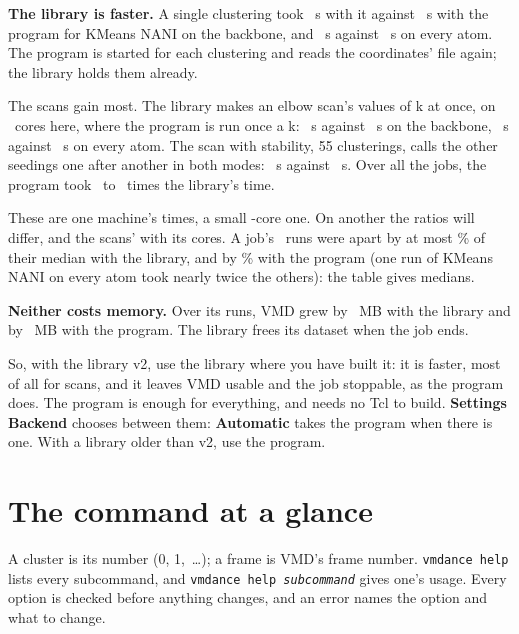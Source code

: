 \documentclass[11pt,letterpaper]{article}
\newcommand{\ui}[1]{\textsf{\textbf{#1}}}
\newcommand{\then}{\,\raisebox{0.15ex}{\scalebox{0.6}{$\blacktriangleright$}}\,}
\newcommand{\cmd}[1]{\texttt{#1}}
\newcommand{\meta}[1]{\textrm{\emph{#1}}}
\begin{document}
\textbf{The library is faster.} A single clustering took \bnKmeansLib\ s
with it against \bnKmeansCli\ s with the program for KMeans NANI on the
backbone, and \bnKmeansAllLib\ s against \bnKmeansAllCli\ s on every atom.
The program is started for each clustering and reads the coordinates' file
again; the library holds them already.

The scans gain most. The library makes an elbow scan's values of k at once,
on \bnCores\ cores here, where the program is run once a k: \bnElbowLib\ s
against \bnElbowCli\ s on the backbone, \bnElbowAllLib\ s against
\bnElbowAllCli\ s on every atom. The scan with stability, 55 clusterings,
calls the other seedings one after another in both modes: \bnStabilityLib\ s
against \bnStabilityCli\ s. Over all the jobs, the program took \bnGainMin\
to \bnGainMax\ times the library's time.

These are one machine's times, a small \bnCores-core one. On another the
ratios will differ, and the scans' with its cores. A job's \bnReps\ runs
were apart by at most \bnSpreadLib\% of their median with the library, and
by \bnSpreadCli\% with the program (one run of KMeans NANI on every atom
took nearly twice the others): the table gives medians.

\textbf{Neither costs memory.} Over its runs, VMD grew by \bnMemLib\ MB with
the library and by \bnMemCli\ MB with the program. The library frees its
dataset when the job ends.

So, with the library v2, use the library where you have built it: it is
faster, most of all for scans, and it leaves VMD usable and the job
stoppable, as the program does. The program is enough for everything, and
needs no Tcl to build. \ui{Settings}\then\ui{Backend} chooses between them:
\ui{Automatic} takes the program when there is one. With a library older
than v2, use the program.

\section{The command at a glance}
\label{sec:command}

A cluster is its number (0, 1,~\ldots); a frame is VMD's frame number.
\cmd{vmdance help} lists every subcommand, and \cmd{vmdance help \meta{subcommand}} gives one's usage. Every option is checked before anything
changes, and an error names the option and what to change.
\end{document}
